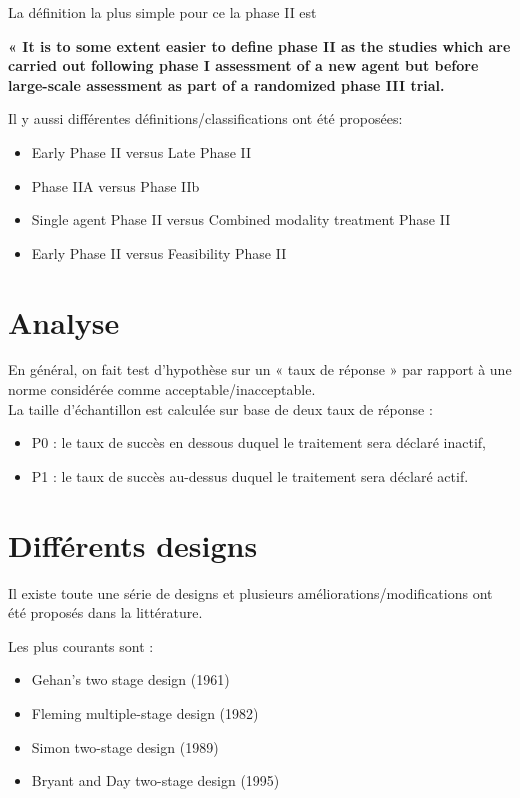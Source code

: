 La définition la plus simple pour ce la phase II est 
\begin{center}
    \textbf{« It is to some extent easier to define phase II as the studies which are carried out following phase I assessment of a new agent but before large-scale assessment as part of a randomized phase III trial.}
\end{center}

Il y aussi différentes définitions/classifications ont été proposées:
\begin{itemize}
    \item Early Phase II versus Late Phase II
    \item Phase IIA versus Phase IIb
    \item Single agent Phase II versus Combined modality treatment Phase II
     \item Early Phase II versus Feasibility Phase II

\end{itemize}

\section{Analyse}

En général, on fait test d’hypothèse sur un « taux de réponse » par rapport à une norme considérée comme acceptable/inacceptable.\\
La taille d’échantillon est calculée sur base de deux taux de réponse :
\begin{itemize}
    \item P0 : le taux de succès en dessous duquel le traitement sera déclaré
inactif,
    \item P1 : le taux de succès au-dessus duquel le traitement sera déclaré
actif.
\end{itemize}

\section{Différents designs}

Il existe toute une série de designs et plusieurs améliorations/modifications ont été proposés dans la littérature.

Les plus courants sont : 
\begin{itemize}
    \item Gehan’s two stage design (1961)
    \item Fleming multiple-stage design (1982)
    \item Simon two-stage design (1989)
    \item Bryant and Day two-stage design (1995)
\end{itemize}

